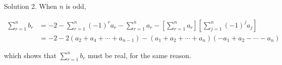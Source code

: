 \documentclass{article}
\begin{document}
\begin{solution}{Solution}
2. When $n$ is odd,

\[
\begin{aligned}
\sum_{r=1}^n b_r &= -2 - \sum_{r=1}^n (-1)^r a_r - \sum_{r=1}^n a_r -
\left[ \sum_{r=1}^n a_r \right] \left[ \sum_{j=1}^n (-1)^j a_j \right]\\
&= -2 - 2(a_2 + a_4 + \cdots + a_{n-1}) -
(a_1 + a_2 + \cdots + a_n)(-a_1 + a_2 - \cdots - a_n)
\end{aligned}
\]

which shows that $\sum_{r=1}^n b_r$ must be real, for the same reason.\\

\end{solution}
\end{document}
